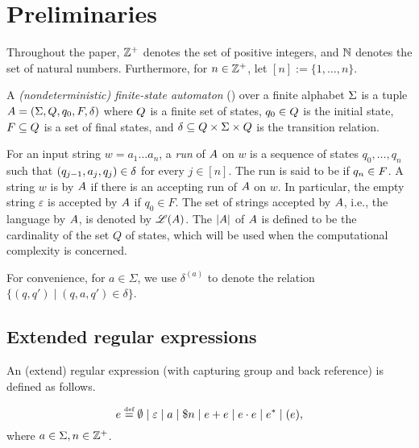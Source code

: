\section{Preliminaries}

Throughout the paper, $\mathbb{Z}^+$ denotes the set of positive integers, and  $\mathbb{N}$ denotes the set of natural numbers. Furthermore, for $n\in \mathbb{Z}^+$, let $[n]:=\{1, \ldots, n\}$. 

\begin{definition} \label{def:nfa}
	A \emph{(nondeterministic) finite-state automaton}
	(\FA{}) over a finite alphabet $\Sigma$ is a tuple ${A} =
	(\Sigma, Q, q_0, F, \delta)$ where 
	$Q$ is a finite set of 
	states, $q_0\in Q$ is
	the initial state, $F\subseteq Q$ is a set of final states, and 
	$\delta\subseteq Q \times 
	\Sigma \times  Q$ is the
	transition relation. 
\end{definition}

For an input string $w=a_1 \dots a_n$, a \emph{run} of ${A}$ on $w$
is a sequence of states $q_0, \ldots, q_n$ such that $(q_{j-1}, a_{j}, q_{j}) \in
\delta$  for every $j \in [n]$.
The run is said to be  if $q_n \in F$.
A string $w$ is  by ${A}$ if there is an accepting run of
${A}$ on $w$. In particular, the empty string $\varepsilon$ is accepted by ${A}$ if $q_0 \in F$. The set of strings accepted by ${A}$, i.e., the language  by ${A}$, is denoted by $\mathscr{L}({A})$.
The  $|{A}|$ of ${A}$ is defined to be the cardinality of the set $Q$ of states, which will be 
used when the computational complexity is concerned.

For convenience, for $a \in \Sigma$, we use $\delta^{(a)}$ to denote the  relation $\{(q, q') \mid (q, a, q') \in \delta\}$.


  
 \subsection{Extended regular expressions}
An (extend) regular expression (with capturing group and back reference) is defined as follows.
  
\begin{definition}
  	\[e \eqdef \emptyset \mid \varepsilon \mid a \mid \$n \mid e + e \mid e \concat e \mid e^* \mid (e)  , \]
  	where $a \in \Sigma, n \in \mathbb{Z}^+$. 
\end{definition}
  	
